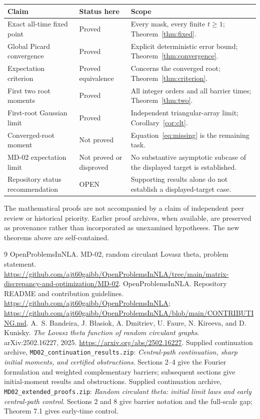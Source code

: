 \documentclass[11pt]{article}
\theoremstyle{remark}\newtheorem{remark}[theorem]{Remark}
\begin{document}
\begin{longtable}{p{}p{}p{}}
\toprule
Claim & Status here & Scope\\\midrule
Exact all-time fixed point & Proved & Every mask, every finite $t\ge1$; Theorem~\ref{thm:fixed}.\\
Global Picard convergence & Proved & Explicit deterministic error bound; Theorem~\ref{thm:convergence}.\\
Expectation criterion & Proved equivalence & Concerns the converged root; Theorem~\ref{thm:criterion}.\\
First two root moments & Proved & All integer orders and all barrier times; Theorem~\ref{thm:two}.\\
First-root Gaussian limit & Proved & Independent triangular-array limit; Corollary~\ref{cor:clt}.\\
Converged-root moment & Not proved & Equation~\eqref{eq:missing} is the remaining task.\\
MD-02 expectation limit & Not proved or disproved & No substantive asymptotic subcase of the displayed target is established.\\
Repository status recommendation & OPEN & Supporting results alone do not establish a displayed-target case.\\
\bottomrule
\end{longtable}

The mathematical proofs are not accompanied by a claim of independent peer
review or historical priority. Earlier proof archives, when available, are
preserved as provenance rather than incorporated as unexamined hypotheses.
The new theorems above are self-contained.

\begin{thebibliography}{9}
OpenProblemsInNLA. MD-02, random circulant Lovasz theta, problem statement.
\url{https://github.com/ajt60gaibb/OpenProblemsInNLA/tree/main/matrix-discrepancy-and-optimization/MD-02}.
OpenProblemsInNLA. Repository README and contribution guidelines.
\url{https://github.com/ajt60gaibb/OpenProblemsInNLA};
\url{https://github.com/ajt60gaibb/OpenProblemsInNLA/blob/main/CONTRIBUTING.md}.
A.~S. Bandeira, J. B{\l}asiok, A. Dmitriev, U. Faure, N. Kireeva, and
D. Kunisky. \emph{The Lovasz theta function of random circulant graphs}.
arXiv:2502.16227, 2025. \url{https://arxiv.org/abs/2502.16227}.
Supplied continuation archive, \texttt{MD02\_continuation\_results.zip}:
\emph{Central-path continuation, sharp initial moments, and certified
obstructions}. Sections 2--4 give the Fourier formulation and weighted
complementary barriers; subsequent sections give initial-moment results and
obstructions.
Supplied continuation archive, \texttt{MD02\_extended\_proofs.zip}:
\emph{Random circulant theta: initial limit laws and early central-path
control}. Sections 2 and 8 give barrier notation and the full-scale gap;
Theorem 7.1 gives early-time control.
\end{thebibliography}
\end{document}
